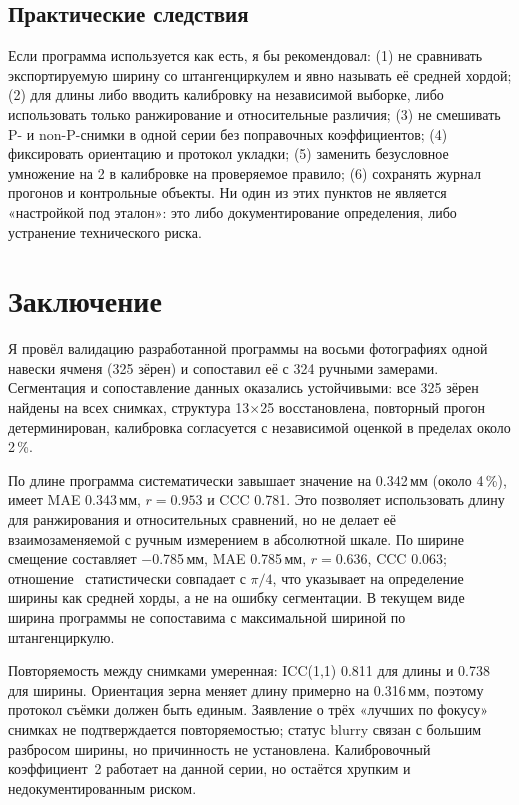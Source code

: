 \documentclass[12pt,a4paper]{article}
\begin{document}
\subsection{Практические следствия}

Если программа используется как есть, я бы рекомендовал: (1) не
сравнивать экспортируемую ширину со штангенциркулем и явно называть её
средней хордой; (2) для длины либо вводить калибровку на независимой
выборке, либо использовать только ранжирование и относительные
различия; (3) не смешивать P- и non-P-снимки в одной серии без
поправочных коэффициентов; (4) фиксировать ориентацию и протокол
укладки; (5) заменить безусловное умножение на 2 в калибровке на
проверяемое правило; (6) сохранять журнал прогонов и контрольные
объекты. Ни один из этих пунктов не является «настройкой под эталон»:
это либо документирование определения, либо устранение технического
риска.

\section{Заключение}

Я провёл валидацию разработанной программы на восьми фотографиях одной
навески ячменя (325 зёрен) и сопоставил её с 324 ручными замерами.
Сегментация и сопоставление данных оказались устойчивыми: все 325 зёрен
найдены на всех снимках, структура 13$\times$25 восстановлена,
повторный прогон детерминирован, калибровка согласуется с независимой
оценкой в пределах около \num{2}\,\%.

По длине программа систематически завышает значение на
\num{0.342}\,мм (около \num{4}\,\%), имеет MAE \num{0.343}\,мм,
$r = \num{0.953}$ и CCC \num{0.781}. Это позволяет использовать длину
для ранжирования и относительных сравнений, но не делает её
взаимозаменяемой с ручным измерением в абсолютной шкале. По ширине
смещение составляет \num{-0.785}\,мм, MAE \num{0.785}\,мм,
$r = \num{0.636}$, CCC \num{0.063}; отношение \WidRatio\
статистически совпадает с $\pi/4$, что указывает на определение ширины
как средней хорды, а не на ошибку сегментации. В текущем виде ширина
программы не сопоставима с максимальной шириной по штангенциркулю.

Повторяемость между снимками умеренная: ICC(1,1) \num{0.811} для длины
и \num{0.738} для ширины. Ориентация зерна меняет длину примерно на
\num{0.316}\,мм, поэтому протокол съёмки должен быть единым.
Заявление о трёх «лучших по фокусу» снимках не подтверждается
повторяемостью; статус blurry связан с большим разбросом ширины, но
причинность не установлена. Калибровочный коэффициент~2 работает на
данной серии, но остаётся хрупким и недокументированным риском.
\end{document}
